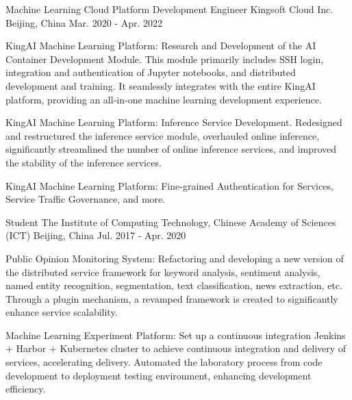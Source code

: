 \begin{cventries}
  \cventry
    {Machine Learning Cloud Platform Development Engineer} %
    {Kingsoft Cloud Inc.} %
    {Beijing, China} %
    {Mar. 2020 - Apr. 2022} %
    {
      \begin{cvitems} %
        \item {KingAI Machine Learning Platform: Research and Development of the AI Container Development Module. This module primarily includes SSH login, integration and authentication of Jupyter notebooks, and distributed development and training. It seamlessly integrates with the entire KingAI platform, providing an all-in-one machine learning development experience.}
        \item {KingAI Machine Learning Platform: Inference Service Development. Redesigned and restructured the inference service module, overhauled online inference, significantly streamlined the number of online inference services, and improved the stability of the inference services.}
        \item {KingAI Machine Learning Platform: Fine-grained Authentication for Services, Service Traffic Governance, and more.}
      \end{cvitems}
    }

    \cventry
    {Student} %
    {The Institute of Computing Technology, Chinese Academy of Sciences (ICT)} %
    {Beijing, China} %
    {Jul. 2017 - Apr. 2020} %
    {
      \begin{cvitems} %
        \item {Public Opinion Monitoring System: Refactoring and developing a new version of the distributed service framework for keyword analysis, sentiment analysis, named entity recognition, segmentation, text classification, news extraction, etc. Through a plugin mechanism, a revamped framework is created to significantly enhance service scalability.}
        \item {Machine Learning Experiment Platform: Set up a continuous integration Jenkins + Harbor + Kubernetes cluster to achieve continuous integration and delivery of services, accelerating delivery. Automated the laboratory process from code development to deployment testing environment, enhancing development efficiency.}
      \end{cvitems}
    }


\end{cventries}
